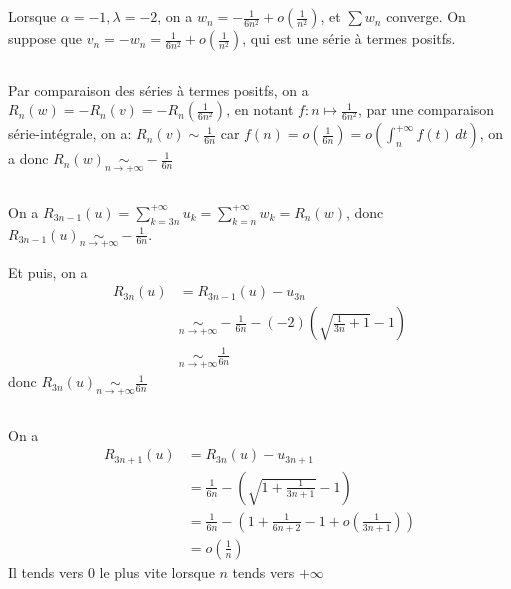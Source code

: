 \documentclass[a4paper,12pt]{book}
\begin{document}
\section{}
Lorsque $\alpha=-1, \lambda=-2$, on a $w_n=-\frac{1}{6n^2}+o\left(\frac{1}{n^2}\right)$, et $\sum w_n$ converge.
On suppose que $v_n=-w_n=\frac{1}{6n^2}+o\left(\frac{1}{n^2}\right)$, qui est une série à termes positfs.
\subsection{}
Par comparaison des séries à termes positfs, on a $R_n(w)=-R_n(v)=-R_n(\frac{1}{6n^2})$, en notant $f: n\mapsto \frac{1}{6n^2}$, 
par une comparaison série-intégrale, on a: $R_n(v)\mathop{\sim}\limits \frac{1}{6n}$ car $f(n)=o\left(\frac{1}{6n}\right)=o\left(\int_n^{+\infty}f(t)\,dt\right)$,
on a donc $\boxed{R_n(w)\mathop{\sim}\limits_{n \to +\infty} -\frac{1}{6n}}$   
\subsection{}
On a $R_{3n-1}(u)=\sum_{k=3n}^{+\infty}u_k=\sum_{k=n}^{+\infty}w_k=R_n(w)$, 
donc $\boxed{R_{3n-1}(u) \mathop{\sim}\limits_{n \to +\infty} -\frac{1}{6n}}$. 

Et puis, on a
\begin{align*}
    R_{3n}(u)&=R_{3n-1}(u)-u_{3n}\\
             &\mathop{\sim}\limits_{n \to +\infty}-\frac{1}{6n}-(-2)\left(\sqrt{\frac{1}{3n}+1}-1\right)\\
             &\mathop{\sim}\limits_{n \to +\infty}\frac{1}{6n}
\end{align*}
donc $\boxed{R_{3n}(u) \mathop{\sim}\limits_{n \to +\infty} \frac{1}{6n}}$
\subsection{}
On a 
\begin{align*}
    R_{3n+1}(u)&=R_{3n}(u)-u_{3n+1}\\
               &=\frac{1}{6n}-\left(\sqrt{1+\frac{1}{3n+1}}-1\right)\\
               &=\frac{1}{6n}-\left(1+\frac{1}{6n+2}-1+o\left(\frac{1}{3n+1}\right)\right)\\
               &=o(\frac{1}{n})
\end{align*}
Il tends vers $0$ le plus vite lorsque $n$ tends vers $+\infty$
\end{document}
